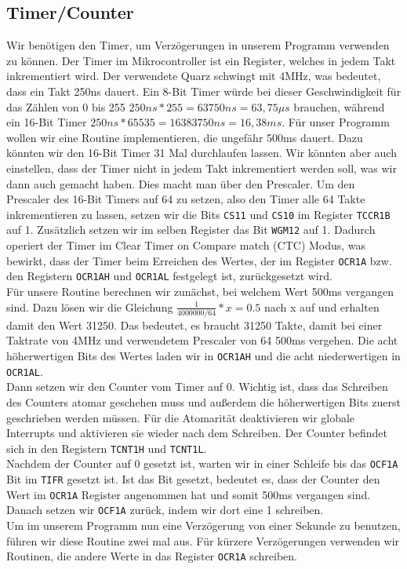 \documentclass[]{article}
\begin{document}
\subsection{Timer/Counter}
Wir benötigen den Timer, um Verzögerungen in unserem Programm verwenden zu können. Der Timer im Mikrocontroller ist ein Register, welches in jedem Takt inkrementiert wird. Der verwendete Quarz schwingt mit 4MHz, was bedeutet, dass ein Takt 250ns dauert. Ein 8-Bit Timer würde bei dieser Geschwindigkeit für das Zählen von 0 bis 255 $250ns*255 = 63750ns = 63,75\mu s$ brauchen, während ein 16-Bit Timer  $250ns*65535 = 16383750ns = 16,38ms$. Für unser Programm wollen wir eine Routine implementieren, die ungefähr 500ms dauert. Dazu könnten wir den 16-Bit Timer 31 Mal durchlaufen lassen. Wir könnten aber auch einstellen, dass der Timer nicht in jedem Takt inkrementiert werden soll, was wir dann auch gemacht haben. Dies macht man über den Prescaler. Um den Prescaler des 16-Bit Timers auf 64 zu setzen, also den Timer alle 64 Takte inkrementieren zu lassen, setzen wir die Bits \texttt{CS11} und \texttt{CS10} im Register \texttt{TCCR1B} auf 1. Zusätzlich setzen wir im selben Register das Bit \texttt{WGM12} auf 1. Dadurch operiert der Timer im Clear Timer on Compare match (CTC) Modus, was bewirkt, dass der Timer beim Erreichen des Wertes, der im Register \texttt{OCR1A} bzw. den Registern \texttt{OCR1AH} und \texttt{OCR1AL} festgelegt ist, zurückgesetzt wird. 
\\Für unsere Routine berechnen wir zunächst, bei welchem Wert 500ms vergangen sind. Dazu lösen wir die Gleichung $\frac{1}{4000000/64} * x = 0.5$ nach x auf und erhalten damit den Wert 31250. Das bedeutet, es braucht 31250 Takte, damit bei einer Taktrate von 4MHz und verwendetem Prescaler von 64 500ms vergehen. Die acht höherwertigen Bits des Wertes laden wir in \texttt{OCR1AH} und die acht niederwertigen in \texttt{OCR1AL}. 
\\Dann setzen wir den Counter vom Timer auf 0. Wichtig ist, dass das Schreiben des Counters atomar geschehen muss und außerdem die höherwertigen Bits zuerst geschrieben werden müssen. Für die Atomarität deaktivieren wir globale Interrupts und aktivieren sie wieder nach dem Schreiben. Der Counter befindet sich in den Registern \texttt{TCNT1H} und \texttt{TCNT1L}.
\\Nachdem der Counter auf 0 gesetzt ist, warten wir in einer Schleife bis das \texttt{OCF1A} Bit im \texttt{TIFR} gesetzt ist. Ist das Bit gesetzt, bedeutet es, dass der Counter den Wert im \texttt{OCR1A} Register angenommen hat und somit 500ms vergangen sind. Danach setzen wir \texttt{OCF1A} zurück, indem wir dort eine 1 schreiben.
\\Um im unserem Programm nun eine Verzögerung von einer Sekunde zu benutzen, führen wir diese Routine zwei mal aus. Für kürzere Verzögerungen verwenden wir Routinen, die andere Werte in das Register \texttt{OCR1A} schreiben.
\end{document}

